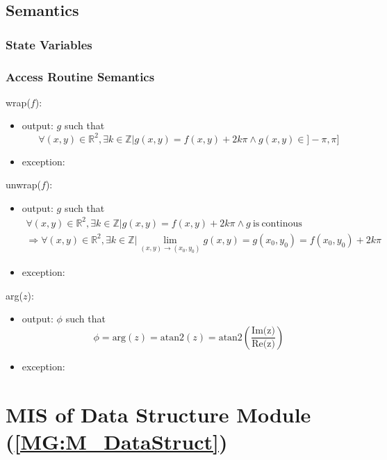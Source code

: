\documentclass[12pt, titlepage]{article}
\begin{document}
\subsection{Semantics}

\subsubsection{State Variables}


\subsubsection{Access Routine Semantics}

\noindent wrap($f$):
\begin{itemize} 
\item output: $g$ such that
\begin{equation*}
\forall (x,y) \in \mathbb{R}^2, \exists k \in \mathbb{Z} | g(x,y) =f(x,y)+ 2k\pi \wedge g(x,y) \in ]-\pi,\pi]
\end{equation*} 
\item exception:
\end{itemize}

\noindent unwrap($f$):
\begin{itemize} 
\item output: $g$ such that
\begin{equation*}
\begin{gathered}
\forall (x,y) \in \mathbb{R}^2, \exists k \in \mathbb{Z} | g(x,y) =f(x,y) + 2k\pi \wedge g \ \text{is} \  \text{continous}\\
\Rightarrow \forall (x,y) \in \mathbb{R}^2, \exists k \in \mathbb{Z} | \lim_{(x,y)\to (x_0,y_0)} g(x,y) = g(x_0,y_0) = f(x_0,y_0) + 2k\pi
\end{gathered}
\end{equation*}
\item exception:
\end{itemize}

\noindent arg($z$):
\begin{itemize} 
\item output: $\phi$ such that
\begin{equation*}
\phi=\text{arg}(z)=\text{atan2}(z)=\text{atan2}(\frac{\text{Im(z)}}{\text{Re(z)}})
\end{equation*}
\item exception:
\end{itemize}


\section{MIS of Data Structure Module (\texorpdfstring{\cref{MG:M_DataStruct}}))} \label{MIS_DataStruct}
\end{document}
